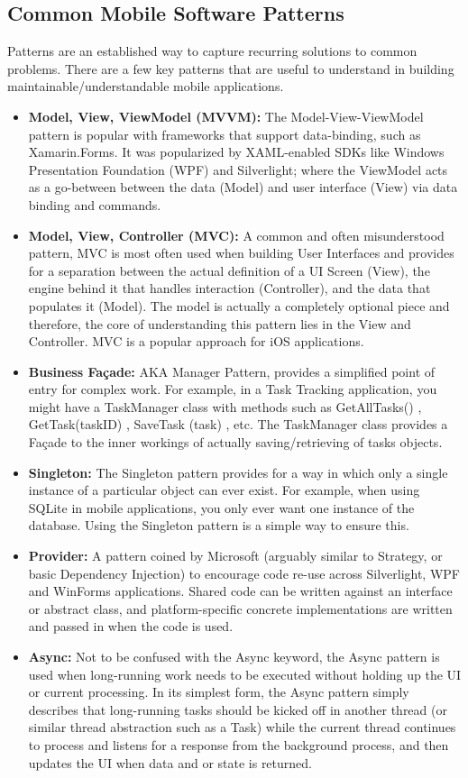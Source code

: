 \subsection{Common Mobile Software Patterns}

Patterns are an established way to capture recurring solutions to common problems. There are a few key patterns that are useful to understand in building maintainable/understandable mobile applications.
\begin{itemize}
\item \textbf{Model, View, ViewModel (MVVM):}  The Model-View-ViewModel pattern is popular with frameworks that support data-binding, such as Xamarin.Forms. It was popularized by XAML-enabled SDKs like Windows Presentation Foundation (WPF) and Silverlight; where the ViewModel acts as a go-between between the data (Model) and user interface (View) via data binding and commands.
\item \textbf{Model, View, Controller (MVC):}   A common and often misunderstood pattern, MVC is most often used when building User Interfaces and provides for a separation between the actual definition of a UI Screen (View), the engine behind it that handles interaction (Controller), and the data that populates it (Model). The model is actually a completely optional piece and therefore, the core of understanding this pattern lies in the View and Controller. MVC is a popular approach for iOS applications.
\item \textbf{Business Façade:}    AKA Manager Pattern, provides a simplified point of entry for complex work. For example, in a Task Tracking application, you might have a TaskManager class with methods such as GetAllTasks() , GetTask(taskID) , SaveTask (task) , etc. The TaskManager class provides a Façade to the inner workings of actually saving/retrieving of tasks objects.
\item \textbf{Singleton:}   The Singleton pattern provides for a way in which only a single instance of a particular object can ever exist. For example, when using SQLite in mobile applications, you only ever want one instance of the database. Using the Singleton pattern is a simple way to ensure this.
\item \textbf{Provider:}    A pattern coined by Microsoft (arguably similar to Strategy, or basic Dependency Injection) to encourage code re-use across Silverlight, WPF and WinForms applications. Shared code can be written against an interface or abstract class, and platform-specific concrete implementations are written and passed in when the code is used.
\item \textbf{Async:}   Not to be confused with the Async keyword, the Async pattern is used when long-running work needs to be executed without holding up the UI or current processing. In its simplest form, the Async pattern simply describes that long-running tasks should be kicked off in another thread (or similar thread abstraction such as a Task) while the current thread continues to process and listens for a response from the background process, and then updates the UI when data and or state is returned.

\end{itemize}


